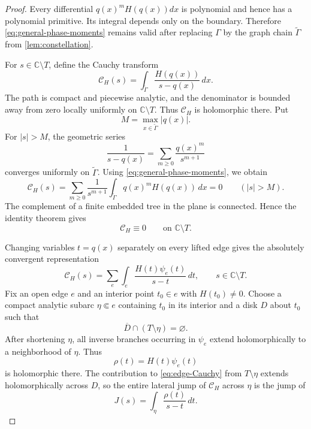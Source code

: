 \documentclass[11pt]{article}
\numberwithin{equation}{section}
\theoremstyle{definition}
\theoremstyle{remark}
\newcommand{\C}{\mathbb C}
\begin{document}
\begin{proof}
Every differential $q(x)^mH(q(x))dx$ is polynomial and hence has a polynomial
primitive.  Its integral depends only on the boundary.  Therefore
\eqref{eq:general-phase-moments} remains valid after replacing $\Gamma$ by the
graph chain $\widetilde\Gamma$ from \cref{lem:constellation}.

For $s\in\C\setminus T$, define the Cauchy transform
\begin{equation}\label{eq:phase-Cauchy-transform}
  \mathcal C_H(s)
  =\int_{\widetilde\Gamma}
    \frac{H(q(x))}{s-q(x)}\,dx.
\end{equation}
The path is compact and piecewise analytic, and the denominator is bounded
away from zero locally uniformly on $\C\setminus T$.  Thus $\mathcal C_H$ is
holomorphic there.  Put
\[
  M=\max_{x\in\widetilde\Gamma}|q(x)|.
\]
For $|s|>M$, the geometric series
\[
  \frac1{s-q(x)}=\sum_{m\ge0}\frac{q(x)^m}{s^{m+1}}
\]
converges uniformly on $\widetilde\Gamma$.  Using
\eqref{eq:general-phase-moments}, we obtain
\[
  \mathcal C_H(s)
  =\sum_{m\ge0}\frac1{s^{m+1}}
    \int_{\widetilde\Gamma}q(x)^mH(q(x))\,dx
  =0
  \qquad(|s|>M).
\]
The complement of a finite embedded tree in the plane is connected.  Hence
the identity theorem gives
\begin{equation}\label{eq:Cauchy-zero}
  \mathcal C_H\equiv0
  \qquad\text{on }\C\setminus T.
\end{equation}

Changing variables $t=q(x)$ separately on every lifted edge gives the
absolutely convergent representation
\begin{equation}\label{eq:edge-Cauchy}
  \mathcal C_H(s)
  =\sum_e\int_e\frac{H(t)\psi_e(t)}{s-t}\,dt,
  \qquad s\in\C\setminus T.
\end{equation}
Fix an open edge $e$ and an interior point $t_0\in e$ with $H(t_0)\ne0$.
Choose a compact analytic subarc $\eta\Subset e$ containing $t_0$ in its
interior and a disk $D$ about $t_0$ such that
\[
  \overline D\cap(T\setminus\eta)=\varnothing.
\]
After shortening $\eta$, all inverse branches occurring in $\psi_e$ extend
holomorphically to a neighborhood of $\eta$.  Thus
\[
  \rho(t)=H(t)\psi_e(t)
\]
is holomorphic there.  The contribution to \eqref{eq:edge-Cauchy} from
$T\setminus\eta$ extends holomorphically across $D$, so the entire lateral jump
of $\mathcal C_H$ across $\eta$ is the jump of
\[
  J(s)=\int_\eta\frac{\rho(t)}{s-t}\,dt.
\]


\end{proof}
\end{document}
